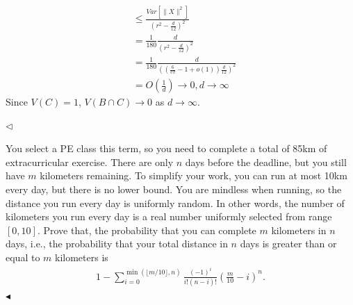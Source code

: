 \documentclass[11pt]{article}
\newenvironment{problem}[2][Problem]{\begin{trivlist}
\item[\hskip \labelsep {\bfseries #1}\hskip \labelsep {\bfseries #2.}]}{\hfill$\blacktriangleleft$\end{trivlist}}
\newenvironment{answer}[1][Answer]{\begin{trivlist}
\item[\hskip \labelsep {\bfseries #1.}\hskip \labelsep]}{\hfill$\lhd$\end{trivlist}}
\begin{document}
\begin{answer}
\begin{itemize}
\begin{align*}
            &\le \frac{Var[\|X\|^2]}{\left(r^2 - \frac{d}{12}\right)^2} \\
            &= \frac{1}{180} \frac{d}{\left(r^2 - \frac{d}{12}\right)^2} \\
            &= \frac{1}{180} \frac{d}{\left(\left(\frac{6}{\mathrm{e}{\pi}} - 1 + o(1)\right)\frac{d}{12}\right)^2} \\
            &= O\left(\frac{1}{d}\right) \to 0, d \to \infty
        \end{align*}
        Since $V(C) = 1$, $V(B \cap C) \to 0$ as $d \to \infty$.
    \end{itemize}
\end{answer}

\begin{problem}{2 (16')}
You select a PE class this term, so you need to complete a total of 85km of extracurricular exercise. There are only $n$ days before the deadline, but you still have $m$ kilometers remaining. To simplify your work, you can run at most 10km every day, but there is no lower bound. You are mindless when running, so the distance you run every day is uniformly random. In other words, the number of kilometers you run every day is a real number uniformly selected from range $[0,10]$. Prove that, the probability that you can complete $m$ kilometers in $n$ days, i.e., the probability that your total distance in $n$ days is greater than or equal to $m$ kilometers is 
\begin{align*}
    1-\sum_{i=0}^{\min(\lfloor m/10\rfloor,n)}\frac{(-1)^i}{i!(n-i)!}\left(\frac{m}{10}-i\right)^n.
\end{align*}
\end{problem}
\end{document}
